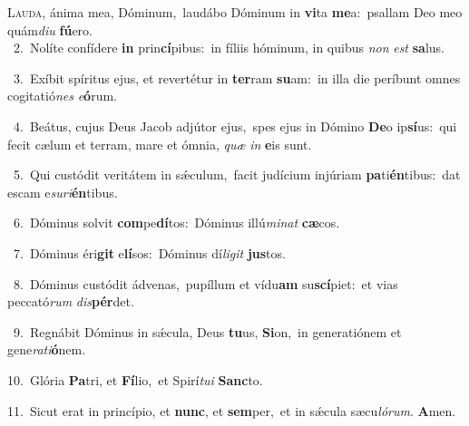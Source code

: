 \lettrine{\initial\textcolor{\initialcolor}{L}}{auda,} ánima mea, Dóminum,~\dagger laudábo Dóminum in \textbf{vi}\-ta \textbf{me}\-a:~\star psallam Deo meo quám\-\textit{di}\-\textit{u} \textbf{fú}\-ero.\\
{\numbfont\textcolor{\numbcolor}{~2.}}~Nolíte confídere \textbf{in} prin\-\textbf{cí}\-pibus:~\star in fíliis hóminum, in quibus \textit{non} \textit{est} \textbf{sa}\-lus.\par
{\numbfont\textcolor{\numbcolor}{~3.}}~Exíbit spíritus ejus, et revertétur in \textbf{ter}\-ram \textbf{su}\-am:~\star in illa die períbunt omnes cogitatió\textit{nes} \textit{e}\-\textbf{ó}rum.\par
{\numbfont\textcolor{\numbcolor}{~4.}}~Beátus, cujus Deus Jacob adjútor ejus,~\dagger spes ejus in Dómino \textbf{De}\-o ip\-\textbf{sí}\-us:~\star qui fecit cælum et terram, mare et ómnia, \textit{quæ} \textit{in} \textbf{e}\-is sunt.\par
{\numbfont\textcolor{\numbcolor}{~5.}}~Qui custódit veritátem in sǽculum,~\dagger facit judícium injúriam \textbf{pa}\-ti\-\textbf{én}\-tibus:~\star dat escam e\-\textit{su}\-\textit{ri}\textbf{én}tibus.\par
{\numbfont\textcolor{\numbcolor}{~6.}}~Dóminus solvit \textbf{com}\-pe\-\textbf{dí}\-tos:~\star Dóminus illú\-\textit{mi}\-\textit{nat} \textbf{cæ}\-cos.\par
{\numbfont\textcolor{\numbcolor}{~7.}}~Dóminus éri\textbf{git} e\-\textbf{lí}\-sos:~\star Dóminus dí\-\textit{li}\-\textit{git} \textbf{jus}\-tos.\par
{\numbfont\textcolor{\numbcolor}{~8.}}~Dóminus custódit ádvenas,~\dagger pupíllum et vídu\textbf{am} su\-\textbf{scí}\-piet:~\star et vias peccató\textit{rum} \textit{dis}\-\textbf{pér}det.\par
{\numbfont\textcolor{\numbcolor}{~9.}}~Regnábit Dóminus in sǽcula, Deus \textbf{tu}\-us, \textbf{Si}\-on,~\star in generatiónem et gene\-\textit{ra}\-\textit{ti}\textbf{ó}nem.\par
{\numbfont\textcolor{\numbcolor}{10.}}~Glória \textbf{Pa}\-tri, et \textbf{Fí}\-lio,~\star et Spirí\-\textit{tu}\-\textit{i} \textbf{Sanc}\-to.\par
{\numbfont\textcolor{\numbcolor}{11.}}~Sicut erat in princípio, et \textbf{nunc}\-, et \textbf{sem}\-per,~\star et in sǽcula sæcu\-\textit{ló}\-\textit{rum}. \textbf{A}\-men.\par

